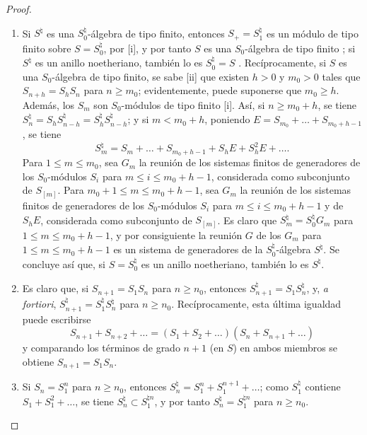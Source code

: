 \documentclass[oneside,10pt]{amsart}
\renewcommand{\leq}{\leqslant}
\renewcommand{\geq}{\geqslant}
\newcommand{\oldpage}[2][]{\marginnote{\normalfont\footnotesize\textbf{#1}~|~#2}\ignorespaces}
\begin{document}
\begin{proof}
\medskip\noindent
\begin{enumerate}
  \item[\rm{(i)}] Si $S^\natural$ es una $S_0^\natural$-álgebra de tipo finito, entonces $S_+=S_1^\natural$ es un módulo de tipo finito sobre $S=S_0^\natural$, por [i], y por tanto $S$ es una $S_0$-álgebra de tipo finito ;
    si $S^\natural$ es un anillo noetheriano, también lo es $S_0^\natural=S$ .
    Recíprocamente, si $S$ es una $S_0$-álgebra
\oldpage[II]{160}
    de tipo finito, se sabe [ii] que existen $h>0$ y $m_0>0$ tales que $S_{n+h}=S_hS_n$ para $n\geq m_0$;
    evidentemente, puede suponerse que $m_0\geq h$.
    Además, los $S_m$ son $S_0$-módulos de tipo finito [i].
    Así, si $n\geq m_0+h$, se tiene $S_n^\natural = S_hS_{n-h}^\natural = S_h^\natural S_{n-h}^\natural$;
    y si $m<m_0+h$, poniendo $E = S_{m_0}+\ldots+S_{m_0+h-1}$, se tiene
    \[
      S_m^\natural = S_m + \ldots + S_{m_0+h-1} + S_hE + S_h^2E + \ldots.
    \]
    Para $1\leq m\leq m_0$, sea $G_m$ la reunión de los sistemas finitos de generadores de los $S_0$-módulos $S_i$ para $m\leq i\leq m_0+h-1$, considerada como subconjunto de $S_{[m]}$.
    Para $m_0+1\leq m\leq m_0+h-1$, sea $G_m$ la reunión de los sistemas finitos de generadores de los $S_0$-módulos $S_i$ para $m\leq i\leq m_0+h-1$ y de $S_hE$, considerada como subconjunto de $S_{[m]}$.
    Es claro que $S_m^\natural=S_0^\natural G_m$ para $1\leq m\leq m_0+h-1$, y por consiguiente la reunión $G$ de los $G_m$ para $1\leq m\leq m_0+h-1$ es un sistema de generadores de la $S_0^\natural$-álgebra $S^\natural$.
    Se concluye así que, si $S=S_0^\natural$ es un anillo noetheriano, también lo es $S^\natural$.
  \item[\rm{(ii)}] Es claro que, si $S_{n+1}=S_1S_n$ para $n\geq n_0$, entonces $S_{n+1}^\natural=S_1S_n^\natural$, y, \emph{a fortiori}, $S_{n+1}^\natural=S_1^\natural S_n^\natural$ para $n\geq n_0$.
    Recíprocamente, esta última igualdad puede escribirse
    \[
      S_{n+1} + S_{n+2} + \ldots
      =
      (S_1 + S_2 + \ldots)(S_n + S_{n+1} + \ldots)
    \]
    y comparando los términos de grado $n+1$ (en $S$) en ambos miembros se obtiene $S_{n+1}=S_1S_n$.
  \item[\rm{(iii)}] Si $S_n=S_1^n$ para $n\geq n_0$, entonces $S_n^\natural=S_1^n+S_1^{n+1}+\ldots$;
    como $S_1^\natural$ contiene $S_1+S_1^2+\ldots$, se tiene $S_n^\natural\subset S_1^{\natural n}$, y por tanto $S_n^\natural=S_1^{\natural n}$ para $n\geq n_0$.

\end{enumerate}
\end{proof}
\end{document}
